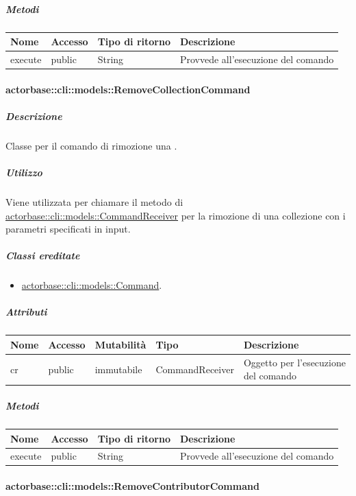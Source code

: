 \documentclass{scalatekids-article}
\begin{document}
\subparagraph{Metodi}

\begin{tabular}{| l | l | l | l |}
  \hline
  Nome & Accesso & Tipo di ritorno & Descrizione\\
  \hline
  execute & public & String & Provvede all'esecuzione del comando\\
  \hline
\end{tabular}

\paragraph{actorbase::cli::models::RemoveCollectionCommand}
\label{sec:actorbase::cli::models::RemoveCollectionCommand}

\subparagraph{Descrizione}

Classe per il comando di rimozione una .

\subparagraph{Utilizzo}

Viene utilizzata per chiamare il metodo di
\hyperref[sec:actorbase::cli::models::CommandReceiver]{actorbase::cli::models::CommandReceiver} per la rimozione di una collezione con
i parametri specificati in input.

\subparagraph{Classi ereditate}

\begin{itemize}
\item \hyperref[sec:actorbase::cli::models::Command]{actorbase::cli::models::Command}.
\end{itemize}

\subparagraph{Attributi}

\begin{tabular}{| p{1cm} | p{1.5cm} | p{2cm} | p{4cm} | p{8.5cm} |}
  \hline
  Nome & Accesso & Mutabilità & Tipo & Descrizione\\
  \hline
  cr & public & immutabile & CommandReceiver & Oggetto per l'esecuzione del comando\\
  \hline
\end{tabular}

\subparagraph{Metodi}

\begin{tabular}{| l | l | l | l |}
  \hline
  Nome & Accesso & Tipo di ritorno & Descrizione\\
  \hline
  execute & public & String & Provvede all'esecuzione del comando\\
  \hline
\end{tabular}

\paragraph{actorbase::cli::models::RemoveContributorCommand}
\label{sec:actorbase::cli::models::RemoveContributorCommand}
\end{document}

